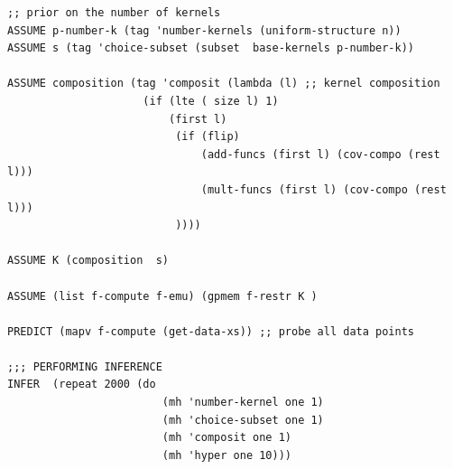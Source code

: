 \documentclass[a0,portrait]{a0poster}
\begin{document}
\begin{multicols}{3}
\begin{minipage}{\linewidth}
\begin{lstlisting}[frame=single,label=alg:structureVent,caption=Venture Code for Bayesian GP Structure Learning,mathescape]
;; prior on the number of kernels
ASSUME p-number-k (tag 'number-kernels (uniform-structure n))
ASSUME s (tag 'choice-subset (subset  base-kernels p-number-k)) 

ASSUME composition (tag 'composit (lambda (l) ;; kernel composition
                     (if (lte ( size l) 1)
                         (first l)
                          (if (flip)
                              (add-funcs (first l) (cov-compo (rest l)))
                              (mult-funcs (first l) (cov-compo (rest l)))
                          ))))
                          
ASSUME K (composition  s)

ASSUME (list f-compute f-emu) (gpmem f-restr K )

PREDICT (mapv f-compute (get-data-xs)) ;; probe all data points

;;; PERFORMING INFERENCE  
INFER  (repeat 2000 (do
                        (mh 'number-kernel one 1) 
                        (mh 'choice-subset one 1) 
                        (mh 'composit one 1) 
                        (mh 'hyper one 10)))
\end{lstlisting}

\end{minipage}



 

\end{multicols}
\end{document}
